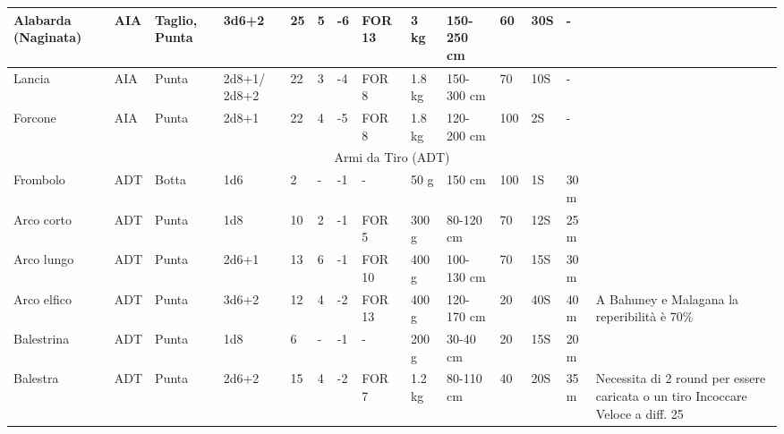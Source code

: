 {\begin{longtable}{|p{1.5cm}|p{0.7cm}|p{0.9cm}|p{0.9cm}|l|l|l|p{0.9cm}|p{0.8cm}|p{1.0cm}|l|l|p{0.75cm}|p{3.2cm}|}
  \raggedright Alabarda (Naginata)& \raggedright AIA& \raggedright Taglio, Punta& \raggedright 3d6+2& \raggedright 25& \raggedright 5& \raggedright -6& \raggedright FOR 13& \raggedright 3 kg& \raggedright 150-250 cm& \raggedright 60& \raggedright 30S& \raggedright -& \raggedright \tabularnewline \hline
  \raggedright Lancia& \raggedright AIA& \raggedright Punta& \raggedright 2d8+1/ 2d8+2& \raggedright 22& \raggedright 3& \raggedright -4& \raggedright FOR 8& \raggedright 1.8 kg& \raggedright 150-300 cm& \raggedright 70& \raggedright 10S& \raggedright -& \raggedright \tabularnewline \hline
  \raggedright Forcone& \raggedright AIA& \raggedright Punta& \raggedright 2d8+1& \raggedright 22& \raggedright 4& \raggedright -5& \raggedright FOR 8& \raggedright 1.8 kg& \raggedright 120-200 cm& \raggedright 100& \raggedright 2S& \raggedright -& \raggedright \tabularnewline \hline
  \hline\multicolumn{14}{|c|}{\normalsize\sc Armi da Tiro (ADT)}\tabularnewline \hline\hline
  \raggedright Frombolo& \raggedright ADT& \raggedright Botta& \raggedright 1d6& \raggedright 2& \raggedright -& \raggedright -1& \raggedright -& \raggedright 50 g& \raggedright 150 cm& \raggedright 100& \raggedright 1S& \raggedright 30 m& \raggedright \tabularnewline \hline
  \raggedright Arco corto& \raggedright ADT& \raggedright Punta& \raggedright 1d8& \raggedright 10& \raggedright 2& \raggedright -1& \raggedright FOR 5& \raggedright 300 g& \raggedright 80-120 cm& \raggedright 70& \raggedright 12S& \raggedright 25 m& \raggedright \tabularnewline \hline
  \raggedright Arco lungo& \raggedright ADT& \raggedright Punta& \raggedright 2d6+1& \raggedright 13& \raggedright 6& \raggedright -1& \raggedright FOR 10& \raggedright 400 g& \raggedright 100-130 cm& \raggedright 70& \raggedright 15S& \raggedright 30 m& \raggedright \tabularnewline \hline
  \raggedright Arco elfico& \raggedright ADT& \raggedright Punta& \raggedright 3d6+2& \raggedright 12& \raggedright 4& \raggedright -2& \raggedright FOR 13& \raggedright 400 g& \raggedright 120-170 cm& \raggedright 20& \raggedright 40S& \raggedright 40 m& \raggedright A Bahuney e Malagana la reperibilit\`a \`e 70\%\tabularnewline \hline
  \raggedright Balestrina& \raggedright ADT& \raggedright Punta& \raggedright 1d8& \raggedright 6& \raggedright -& \raggedright -1& \raggedright -& \raggedright 200 g& \raggedright 30-40 cm& \raggedright 20& \raggedright 15S& \raggedright 20 m& \raggedright \tabularnewline \hline
  \raggedright Balestra& \raggedright ADT& \raggedright Punta& \raggedright 2d6+2& \raggedright 15& \raggedright 4& \raggedright -2& \raggedright FOR 7& \raggedright 1.2 kg& \raggedright 80-110 cm& \raggedright 40& \raggedright 20S& \raggedright 35 m& \raggedright Necessita di 2 round per essere caricata o un tiro Incoccare Veloce a diff. 25\tabularnewline \hline

\end{longtable}}
